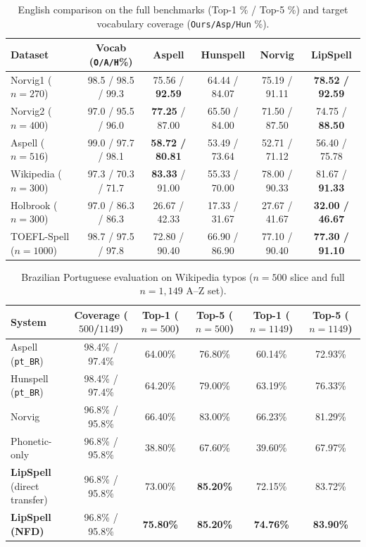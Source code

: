 \documentclass[
  journal=nlp,
  manuscript=research-article,
  year=2026,
]{cup-journal}
\begin{document}
\begin{table}[ht]
\centering
\small
\setlength{\tabcolsep}{4.5pt}
\caption{English comparison on the full benchmarks (Top-1 \% / Top-5 \%) and target vocabulary coverage (\texttt{Ours/Asp/Hun} \%).}
\label{tab:english_cmp}
\begin{tabular}{lccccc}
\toprule
Dataset & Vocab (\texttt{O/A/H}\%) & Aspell & Hunspell & Norvig & LipSpell \\
\midrule
Norvig1 ($n=270$)      & 98.5 / 98.5 / 99.3 & 75.56 / \textbf{92.59} & 64.44 / 84.07 & 75.19 / 91.11 & \textbf{78.52 / 92.59} \\
Norvig2 ($n=400$)      & 97.0 / 95.5 / 96.0 & \textbf{77.25} / 87.00 & 65.50 / 84.00 & 71.50 / 87.50 & 74.75 / \textbf{88.50} \\
Aspell ($n=516$)       & 99.0 / 97.7 / 98.1 & \textbf{58.72 / 80.81} & 53.49 / 73.64 & 52.71 / 71.12 & 56.40 / 75.78 \\
Wikipedia ($n=300$)    & 97.3 / 70.3 / 71.7 & \textbf{83.33} / 91.00 & 55.33 / 70.00 & 78.00 / 90.33 & 81.67 / \textbf{91.33} \\
Holbrook ($n=300$)     & 97.0 / 86.3 / 86.3 & 26.67 / 42.33 & 17.33 / 31.67 & 27.67 / 41.67 & \textbf{32.00 / 46.67} \\
TOEFL-Spell ($n=1000$) & 98.7 / 97.5 / 97.8 & 72.80 / 90.40 & 66.90 / 86.90 & 77.10 / 90.40 & \textbf{77.30 / 91.10} \\
\bottomrule
\end{tabular}
\end{table}

\begin{table}[ht]
\centering
\small
\caption{Brazilian Portuguese evaluation on Wikipedia typos ($n=500$ slice and full $n=1{,}149$ A--Z set).}
\label{tab:ptbr}
\begin{tabular}{lccccc}
\toprule
System & Coverage ($500$/$1149$) & Top-1 ($n=500$) & Top-5 ($n=500$) & Top-1 ($n=1149$) & Top-5 ($n=1149$) \\
\midrule
Aspell (\texttt{pt\_BR})            & 98.4\% / 97.4\% & 64.00\% & 76.80\% & 60.14\% & 72.93\% \\
Hunspell (\texttt{pt\_BR})          & 98.4\% / 97.4\% & 64.20\% & 79.00\% & 63.19\% & 76.33\% \\
Norvig                              & 96.8\% / 95.8\% & 66.40\% & 83.00\% & 66.23\% & 81.29\% \\
Phonetic-only                       & 96.8\% / 95.8\% & 38.80\% & 67.60\% & 39.60\% & 67.97\% \\
\textbf{LipSpell} (direct transfer) & 96.8\% / 95.8\% & 73.00\% & \textbf{85.20\%} & 72.15\% & 83.72\% \\
\textbf{LipSpell (NFD)}             & 96.8\% / 95.8\% & \textbf{75.80\%} & \textbf{85.20\%} & \textbf{74.76\%} & \textbf{83.90\%} \\
\bottomrule
\end{tabular}
\end{table}
\end{document}
